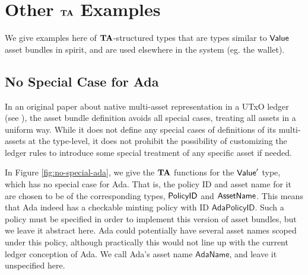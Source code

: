 \section{Other $\mathbf{TA}$ Examples}
\label{sec:other-valmonoids}

We give examples here of $\mathbf{TA}$-structured types
that are types similar to $\mathsf{Value}$ asset bundles in spirit, and are used elsewhere
in the system (eg. the wallet).

\subsection{No Special Case for Ada}

In an original paper about native multi-asset representation in a UTxO ledger
(see \cite{utxo_ma}), the asset bundle definition avoids all special cases, treating
all assets in a uniform way.
While it does not define any special cases of definitions of its multi-assets at the type-level,
it does not prohibit the possibility of customizing the ledger rules to introduce
some special treatment of any specific asset if needed.

In Figure \ref{fig:no-special-ada}, we give the $\mathbf{TA}$ functions for
the $\mathsf{Value}'$ type, which has no special case for Ada. That is, the policy ID and
asset name for it are chosen to be of the corresponding types,
$\mathsf{PolicyID}$ and $\mathsf{AssetName}$. This means
that Ada indeed has a checkable minting policy with ID $\mathsf{AdaPolicyID}$.
Such a policy must be specified in
order to implement this version of asset bundles, but we leave it abstract here.
Ada could potentially have several asset names scoped under this policy, although
practically this would not line up with the current ledger conception of Ada.
We call Ada's asset name $\mathsf{AdaName}$, and leave it unspecified here. \\~\\

